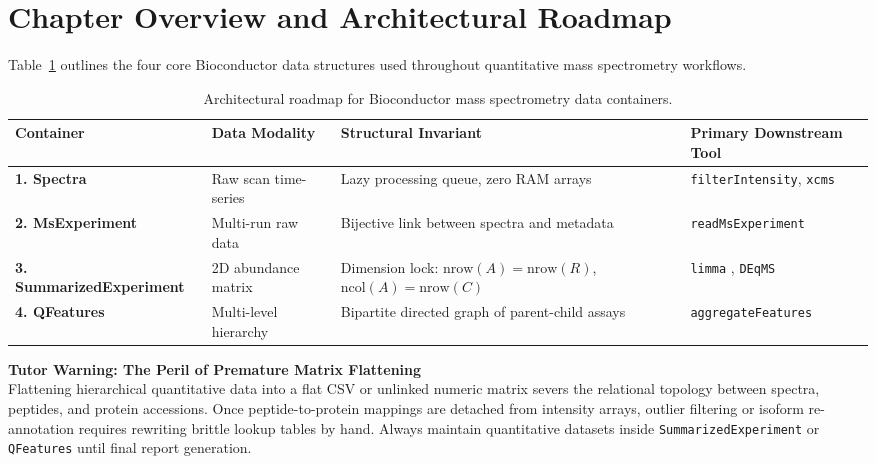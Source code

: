 \documentclass[11pt,twoside,openright]{book}
\begin{document}
\vspace{1em}
\section*{Chapter Overview and Architectural Roadmap}

Table~\ref{tab:containers_roadmap} outlines the four core Bioconductor data structures used throughout quantitative mass spectrometry workflows.

\begin{table}[htbp]
\centering
\caption{Architectural roadmap for Bioconductor mass spectrometry data containers.}
\label{tab:containers_roadmap}
\small
\begin{tabularx}{\textwidth}{>{\raggedright\arraybackslash}l >{\raggedright\arraybackslash}p{3.5cm} >{\raggedright\arraybackslash}X >{\raggedright\arraybackslash}p{3.2cm}}
\toprule
\textbf{Container} & \textbf{Data Modality} & \textbf{Structural Invariant} & \textbf{Primary Downstream Tool} \\
\midrule
\textbf{1. Spectra} & Raw scan time-series \cite{gatto2021spectra} & Lazy processing queue, zero RAM arrays & \texttt{filterIntensity}, \texttt{xcms} \\
\addlinespace
\textbf{2. MsExperiment} & Multi-run raw data \cite{rainer2022msexperiment} & Bijective link between spectra and metadata & \texttt{readMsExperiment} \\
\addlinespace
\textbf{3. SummarizedExperiment} & 2D abundance matrix \cite{huber2015orchestrating} & Dimension lock: $\text{nrow}(A) = \text{nrow}(R)$, $\text{ncol}(A) = \text{nrow}(C)$ & \texttt{limma} \cite{smyth2004limma}, \texttt{DEqMS} \cite{zhu2020deqms} \\
\addlinespace
\textbf{4. QFeatures} & Multi-level hierarchy \cite{gatto2023qfeatures} & Bipartite directed graph of parent-child assays & \texttt{aggregateFeatures} \cite{vanderaa2021reproducible} \\
\bottomrule
\end{tabularx}
\end{table}

\begin{notebox}
\textbf{Tutor Warning: The Peril of Premature Matrix Flattening}\\[0.4em]
Flattening hierarchical quantitative data into a flat CSV or unlinked numeric matrix severs the relational topology between spectra, peptides, and protein accessions. Once peptide-to-protein mappings are detached from intensity arrays, outlier filtering or isoform re-annotation requires rewriting brittle lookup tables by hand. Always maintain quantitative datasets inside \texttt{SummarizedExperiment} or \texttt{QFeatures} until final report generation.
\end{notebox}
\end{document}
